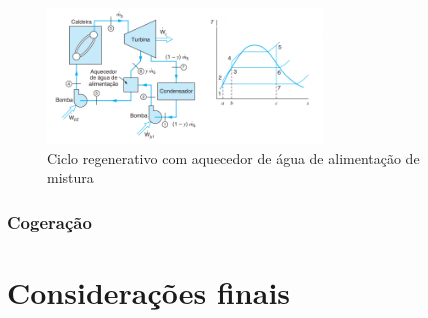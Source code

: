 \documentclass[
	article,			%
	11pt,				%
	oneside,			%
	a4paper,			%
	english,			%
	brazil,				%
	sumario=tradicional
	]{abntex2}
\begin{document}
\begin{figure}[h]
	\centering
	\includegraphics[width=0.65\textwidth]{./images/regenerativo-aquecedor.png}
	\caption{Ciclo regenerativo com aquecedor de água de alimentação de mistura}
	\label{fig:reg-aquecedor}
\end{figure}

\subsubsection{Cogeração}




%

\section{Considerações finais}

\postextual

\clearpage

\end{document}
